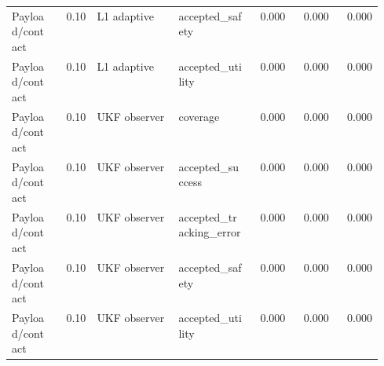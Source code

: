 \documentclass{article}
\begin{document}
\begin{center}
\begin{longtable}{p{0.13\linewidth}rp{0.22\linewidth}p{0.20\linewidth}rrr}
Payload/contact & 0.10 & L1 adaptive & accepted\_safety & 0.000 & 0.000 & 0.000\\
Payload/contact & 0.10 & L1 adaptive & accepted\_utility & 0.000 & 0.000 & 0.000\\
Payload/contact & 0.10 & UKF observer & coverage & 0.000 & 0.000 & 0.000\\
Payload/contact & 0.10 & UKF observer & accepted\_success & 0.000 & 0.000 & 0.000\\
Payload/contact & 0.10 & UKF observer & accepted\_tracking\_error & 0.000 & 0.000 & 0.000\\
Payload/contact & 0.10 & UKF observer & accepted\_safety & 0.000 & 0.000 & 0.000\\
Payload/contact & 0.10 & UKF observer & accepted\_utility & 0.000 & 0.000 & 0.000\\
\bottomrule
\end{longtable}
\normalsize
\end{center}
\end{document}
